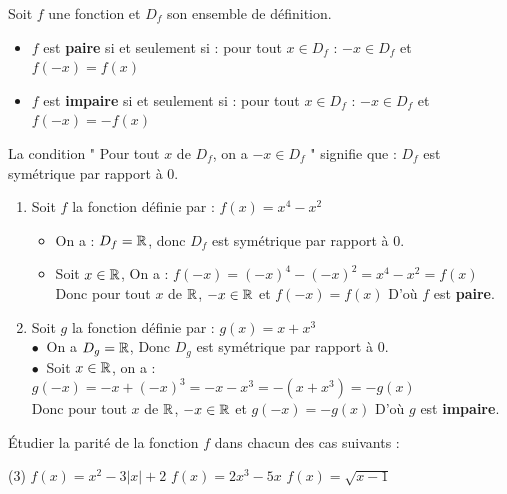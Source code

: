 \documentclass[10pt, a4paper]{article}
\begin{document}
\begin{Definition}[]
Soit $f$ une fonction et $D_f$ son ensemble de définition.
\begin{itemize}[leftmargin=*,itemsep=0.5pt]
    \item $f$ est \textbf{paire} si et seulement si : pour tout $x \in D_f$ : $-x \in D_f$ et $f(-x) = f(x)$
    \item $f$ est \textbf{impaire} si et seulement si : pour tout $x \in D_f$ : $-x \in D_f$ et $f(-x) = -f(x)$
\end{itemize}
\end{Definition}

\begin{Remarque}
 La condition " Pour tout $x$ de $D_f$, on a $-x \in D_f$ " signifie que :
$D_f$ est symétrique par rapport à $0$.
\end{Remarque}

\begin{Exemple}[][15 min]
\begin{enumerate}[leftmargin=*,itemsep=0.5pt]
    \item Soit $f$ la fonction définie par :  $f(x) = x^4 - x^2$
\begin{itemize}[leftmargin=*,itemsep=0.5pt]
    \item On a :  $D_f = \mathbb{R}$, donc $D_f$ est symétrique par rapport à $0$.

    \item Soit $x \in \mathbb{R}$, On a :
         $f(-x) = (-x)^4 - (-x)^2 = x^4 - x^2 = f(x)$ \\
    Donc pour tout $x$ de $\mathbb{R}$, $-x \in \mathbb{R}$ et $f(-x)=f(x)$ \quad
    D'où $f$ est \textbf{paire}.
\end{itemize}
    \item Soit $g$ la fonction définie par : $g(x) = x + x^3$
    \vspace{0.1cm} \\
    $\bullet~$ On a $D_g = \mathbb{R}$, Donc $D_g$ est symétrique par rapport à $0$. \\
    $\bullet~$ Soit $x \in \mathbb{R}$,  on a : \quad  $g(-x) = -x + (-x)^3 = -x - x^3 = -(x + x^3) = -g(x)$ \\
    Donc pour tout $x$ de $\mathbb{R}$, $-x \in \mathbb{R}$ et $g(-x)=-g(x)$ \quad
    D'où $g$ est \textbf{impaire}.
\end{enumerate}
\end{Exemple}

\begin{Application}[][30 min]
Étudier la parité de la fonction $f$ dans chacun des cas suivants :
\vspace{0.2cm} 
\begin{tasks}[ label-width=15pt, item-indent=20pt](3)
    \task $f(x) = x^2 - 3|x| + 2$
    \task $f(x) = 2x^3 - 5x$
    \task $f(x) = \sqrt{x - 1}$
\end{tasks}
\end{Application}
\end{document}

